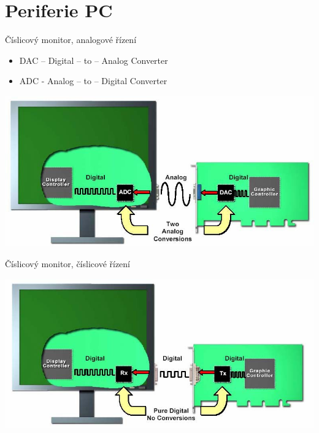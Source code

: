 \documentclass[aspectratio=43]{beamer}
\begin{document}
\section{Periferie PC}
\begin{frame}{Číslicový monitor, analogové řízení}
	\begin{itemize}
		\item DAC – Digital – to – Analog Converter 
		\item ADC - Analog – to – Digital Converter 
	\end{itemize}
	\begin{center}
		\includegraphics[width=0.8\linewidth]{extrahovane_obrazky/img_5_page1_0.jpeg}
	\end{center}
	
\end{frame}


\begin{frame}{Číslicový monitor, číslicové řízení}
	 
	\begin{center}
		\includegraphics[width=0.8\linewidth]{extrahovane_obrazky/img_5_page2_0.jpeg}
	\end{center}
	
\end{frame}
\end{document}
